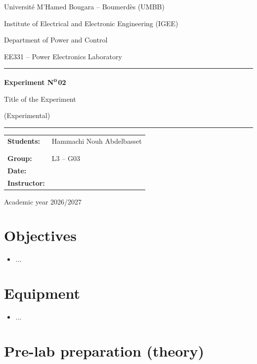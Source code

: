 \documentclass[11pt,a4paper]{article}
\newcommand{\course}{EE331 -- Power Electronics Laboratory}   %
\newcommand{\department}{Department of Power and Control}
\newcommand{\labnumber}{02}
\newcommand{\labtitle}{Title of the Experiment}
\newcommand{\labtype}{(Experimental)}                         %
\newcommand{\studentA}{Hammachi Nouh Abdelbasset}
\newcommand{\studentB}{\dotfill}
\newcommand{\studentC}{\dotfill}
\newcommand{\group}{L3 -- G03}
\newcommand{\labdate}{\dotfill}
\newcommand{\instructor}{\dotfill}
\begin{document}
\begin{titlepage}
\centering
{\large Université M'Hamed Bougara -- Boumerdès (UMBB)\par}
{\large Institute of Electrical and Electronic Engineering (IGEE)\par}
{\department\par}
\vspace{2.2cm}
{\Large \course\par}
\vspace{0.8cm}
\rule{\linewidth}{1pt}\par\vspace{0.3cm}
{\Huge\bfseries Experiment N\textsuperscript{o}\,\labnumber\par}
\vspace{0.3cm}
{\LARGE \labtitle\par}
\vspace{0.2cm}
{\large \labtype\par}
\rule{\linewidth}{1pt}\par
\vspace{2cm}
\begin{tabular}{>{\bfseries}l p{8cm}}
Students:   & \studentA \\ & \studentB \\ & \studentC \\[4pt]
Group:      & \group \\[4pt]
Date:       & \labdate \\[4pt]
Instructor: & \instructor
\end{tabular}
\vfill
{\large Academic year 2026/2027\par}
\end{titlepage}

\tableofcontents
\newpage

\section{Objectives}
\begin{itemize}[nosep]
\item ...
\end{itemize}

\section{Equipment}
\begin{itemize}[nosep]
\item ...
\end{itemize}

\section{Pre-lab preparation (theory)}
\end{document}
